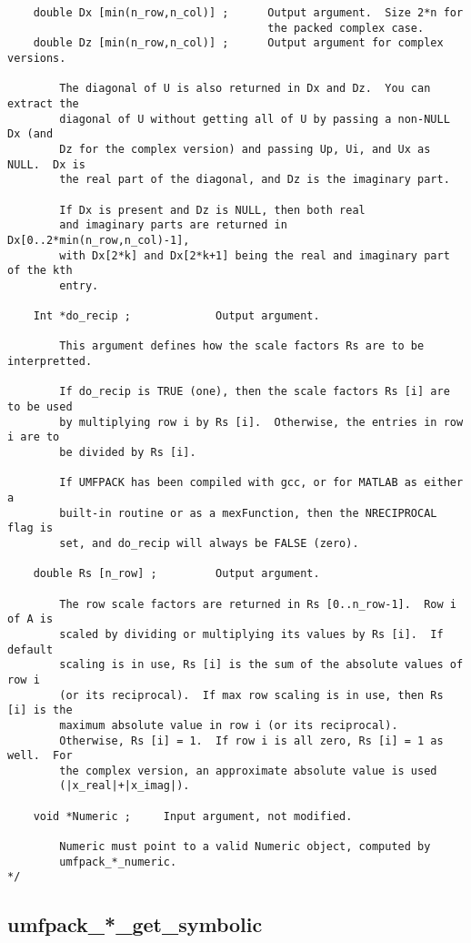 \documentclass[11pt]{article}
\begin{document}
{\begin{verbatim}
    double Dx [min(n_row,n_col)] ;      Output argument.  Size 2*n for
                                        the packed complex case.
    double Dz [min(n_row,n_col)] ;      Output argument for complex versions.

        The diagonal of U is also returned in Dx and Dz.  You can extract the
        diagonal of U without getting all of U by passing a non-NULL Dx (and
        Dz for the complex version) and passing Up, Ui, and Ux as NULL.  Dx is
        the real part of the diagonal, and Dz is the imaginary part.

        If Dx is present and Dz is NULL, then both real
        and imaginary parts are returned in Dx[0..2*min(n_row,n_col)-1],
        with Dx[2*k] and Dx[2*k+1] being the real and imaginary part of the kth
        entry.

    Int *do_recip ;             Output argument.

        This argument defines how the scale factors Rs are to be interpretted.

        If do_recip is TRUE (one), then the scale factors Rs [i] are to be used
        by multiplying row i by Rs [i].  Otherwise, the entries in row i are to
        be divided by Rs [i].

        If UMFPACK has been compiled with gcc, or for MATLAB as either a
        built-in routine or as a mexFunction, then the NRECIPROCAL flag is
        set, and do_recip will always be FALSE (zero).

    double Rs [n_row] ;         Output argument.

        The row scale factors are returned in Rs [0..n_row-1].  Row i of A is
        scaled by dividing or multiplying its values by Rs [i].  If default
        scaling is in use, Rs [i] is the sum of the absolute values of row i
        (or its reciprocal).  If max row scaling is in use, then Rs [i] is the
        maximum absolute value in row i (or its reciprocal).
        Otherwise, Rs [i] = 1.  If row i is all zero, Rs [i] = 1 as well.  For
        the complex version, an approximate absolute value is used
        (|x_real|+|x_imag|).

    void *Numeric ;     Input argument, not modified.

        Numeric must point to a valid Numeric object, computed by
        umfpack_*_numeric.
*/
\end{verbatim}
}

\newpage
\subsection{umfpack\_*\_get\_symbolic}
\end{document}
